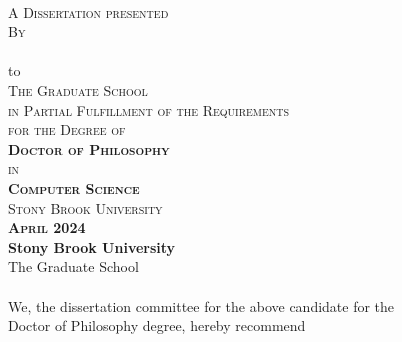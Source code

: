 \begin{center}
    
    \thispagestyle{empty}
    {\large \textsc{\textbf{\ttitle}}}  \\
    \vspace{0.9cm}
    \textsc{A Dissertation presented}  \\
    \vspace{0.45cm}
    \textsc{By}  \\
    \vspace{0.45cm}
    {\large \textsc{\textbf{\authorname}}}  \\
    \vspace{0.9cm}
    to  \\
    \vspace{0.45cm}
    \textsc{The Graduate School}  \\
    \vspace{0.45cm}
    \textsc{in Partial Fulfillment of the Requirements}  \\
    \vspace{0.45cm}
    \textsc{for the Degree of}  \\
    \vspace{0.45cm}
    \textsc{\textbf{Doctor of Philosophy}}  \\
    \vspace{0.45cm}
    \textsc{in}  \\
    \vspace{0.45cm}
    \textsc{\textbf{Computer Science}}  \\
    \vspace{1.2cm}
    \textsc{Stony Brook University}  \\
    \vspace{1.2cm}
    \textsc{\textbf{April 2024}}  \\
    \eject 
    \setcounter{page}{2}
    {\large \textbf{Stony Brook University}}  \\
    \vspace{0.25cm}
    The Graduate School  \\
    \vspace{0.5cm}
    \textbf{\authorname}  \\
    \vspace{0.5cm}
    {We}, the dissertation committee for the above candidate for the  \\
    \vspace{0.25cm}
    Doctor of Philosophy degree, hereby recommend  \\

\end{center}
